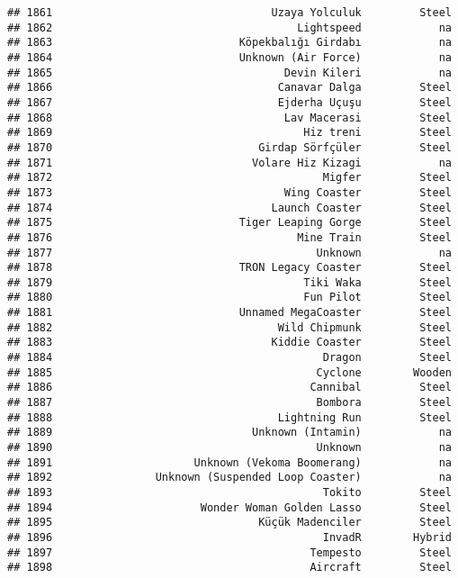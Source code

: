\documentclass[
]{article}
\begin{document}
\begin{verbatim}
## 1861                                  Uzaya Yolculuk         Steel
## 1862                                      Lightspeed            na
## 1863                             Köpekbalığı Girdabı            na
## 1864                             Unknown (Air Force)            na
## 1865                                    Devin Kileri            na
## 1866                                   Canavar Dalga         Steel
## 1867                                   Ejderha Uçuşu         Steel
## 1868                                    Lav Macerasi         Steel
## 1869                                       Hiz treni         Steel
## 1870                                Girdap Sörfçüler         Steel
## 1871                               Volare Hiz Kizagi            na
## 1872                                          Migfer         Steel
## 1873                                    Wing Coaster         Steel
## 1874                                  Launch Coaster         Steel
## 1875                             Tiger Leaping Gorge         Steel
## 1876                                      Mine Train         Steel
## 1877                                         Unknown            na
## 1878                             TRON Legacy Coaster         Steel
## 1879                                       Tiki Waka         Steel
## 1880                                       Fun Pilot         Steel
## 1881                             Unnamed MegaCoaster         Steel
## 1882                                   Wild Chipmunk         Steel
## 1883                                  Kiddie Coaster         Steel
## 1884                                          Dragon         Steel
## 1885                                         Cyclone        Wooden
## 1886                                        Cannibal         Steel
## 1887                                         Bombora         Steel
## 1888                                   Lightning Run         Steel
## 1889                               Unknown (Intamin)            na
## 1890                                         Unknown            na
## 1891                      Unknown (Vekoma Boomerang)            na
## 1892                Unknown (Suspended Loop Coaster)            na
## 1893                                          Tokito         Steel
## 1894                       Wonder Woman Golden Lasso         Steel
## 1895                                Küçük Madenciler         Steel
## 1896                                          InvadR        Hybrid
## 1897                                        Tempesto         Steel
## 1898                                        Aircraft         Steel

\end{verbatim}
\end{document}
